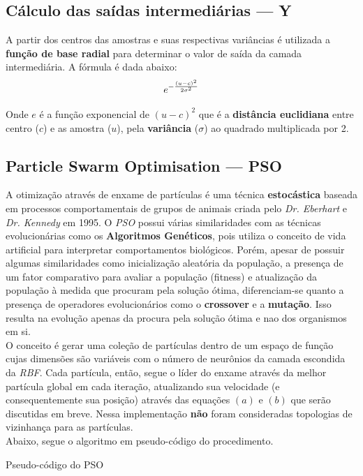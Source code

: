 \documentclass[10pt,twocolumn,letterpaper]{article}
\begin{document}
\subsection{Cálculo das saídas intermediárias --- Y}

A partir dos centros das amostras e suas respectivas variâncias é utilizada a \textbf{função de base radial} para determinar o valor de saída da camada intermediária. A fórmula é dada abaixo:
\begin{equation}
\Large{e^{- \frac{(u - c)^2}{2\sigma^2}}}
\end{equation}

Onde \large{$e$} é a função exponencial de $(u-c)^2$ que é a \textbf{distância euclidiana} entre centro ($c$) e as amostra ($u$), pela \textbf{variância} ($\sigma$) ao quadrado multiplicada por 2.

\subsection{Particle Swarm Optimisation --- PSO}
A otimização através de enxame de partículas é uma técnica \textbf{estocástica} baseada em processos comportamentais de grupos de animais criada pelo \textit{Dr. Eberhart} e  \textit{Dr. Kennedy} em 1995. O \textit{PSO} possui várias similaridades com as técnicas evolucionárias como os \textbf{Algoritmos Genéticos}, pois utiliza o conceito de vida artificial para interpretar comportamentos biológicos. Porém, apesar de possuir algumas similaridades como inicialização aleatória da população, a presença de um fator comparativo para avaliar a população (fitness) e atualização da população à medida que procuram pela solução ótima, diferenciam-se quanto a presença de operadores evolucionários como o \textbf{crossover} e a \textbf{mutação}. Isso resulta na evolução apenas da procura pela solução ótima e nao dos organismos em si.\\
O conceito é gerar uma coleção de partículas dentro de um espaço de função cujas dimensões são variáveis com o número de neurônios da camada escondida da \textit{RBF}. Cada partícula, então, segue o líder do enxame através da melhor partícula global em cada iteração, atualizando sua velocidade (e consequentemente sua posição) através das equações $(a)$ e $(b)$ que serão discutidas em breve. Nessa implementação \textbf{não} foram consideradas topologias de vizinhança para as partículas.~\cite{xiao}\\Abaixo, segue o algoritmo em pseudo-código do procedimento.
\newpage
\begin{algorithm}[h!]
\caption{Pseudo-código do PSO}
\end{algorithm}
\end{document}
